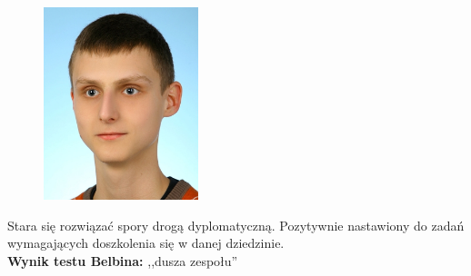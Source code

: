\begin{figure}[H]
	\centering
	\includegraphics[width=0.4\textwidth]{img/bartek.jpg}
\end{figure}
Stara się rozwiązać spory drogą dyplomatyczną. Pozytywnie nastawiony do zadań wymagających doszkolenia się w danej dziedzinie. \\
\textbf{Wynik testu Belbina: },,dusza zespołu''
